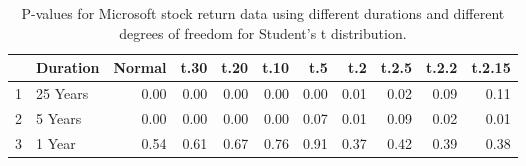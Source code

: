 \begin{table}[ht]
\centering
\begin{tabular}{rlrrrrrrrrr}
  \hline
 & Duration & Normal & t.30 & t.20 & t.10 & t.5 & t.2 & t.2.5 & t.2.2 & t.2.15 \\ 
  \hline
1 & 25 Years & 0.00 & 0.00 & 0.00 & 0.00 & 0.00 & 0.01 & 0.02 & 0.09 & 0.11 \\ 
  2 & 5 Years & 0.00 & 0.00 & 0.00 & 0.00 & 0.07 & 0.01 & 0.09 & 0.02 & 0.01 \\ 
  3 & 1 Year & 0.54 & 0.61 & 0.67 & 0.76 & 0.91 & 0.37 & 0.42 & 0.39 & 0.38 \\ 
   \hline
\end{tabular}
\caption{P-values for Microsoft stock return data using different durations
  and different degrees of freedom for Student's t distribution.} 
\end{table}

